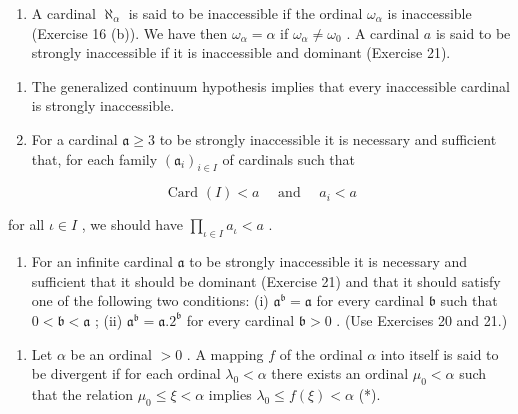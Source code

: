 \begin{enumerate}
\def\labelenumi{\arabic{enumi}.}
\setcounter{enumi}{21}
\tightlist
\item
  A cardinal \(\aleph_{\alpha}\) is said to be inaccessible if the ordinal \(\omega_{\alpha}\) is inaccessible (Exercise 16 (b)). We have then \(\omega_{\alpha} = \alpha\) if \(\omega_{\alpha} \neq \omega_{0}\) . A cardinal \(a\) is said to be strongly inaccessible if it is inaccessible and dominant (Exercise 21).
\end{enumerate}

\begin{enumerate}
\def\labelenumi{(\alph{enumi})}
\item
  The generalized continuum hypothesis implies that every inaccessible cardinal is strongly inaccessible.
\item
  For a cardinal \(\mathfrak{a} \geqslant 3\) to be strongly inaccessible it is necessary and sufficient that, for each family \((\mathfrak{a}_i)_{i \in I}\) of cardinals such that
\end{enumerate}

\[
\text { Card } (I) <   a \quad \text { and } \quad a _ {i} <   a
\]

for all \(\iota \in I\) , we should have \(\prod_{\iota \in I} a_{\iota} < a\) .

\begin{enumerate}
\def\labelenumi{(\alph{enumi})}
\setcounter{enumi}{2}
\tightlist
\item
  For an infinite cardinal \(\mathfrak{a}\) to be strongly inaccessible it is necessary and sufficient that it should be dominant (Exercise 21) and that it should satisfy one of the following two conditions: (i) \(\mathfrak{a}^{\mathfrak{b}} = \mathfrak{a}\) for every cardinal \(\mathfrak{b}\) such that \(0 < \mathfrak{b} < \mathfrak{a}\) ; (ii) \(\mathfrak{a}^{\mathfrak{b}} = \mathfrak{a}.2^{\mathfrak{b}}\) for every cardinal \(\mathfrak{b} > 0\) . (Use Exercises 20 and 21.)
\end{enumerate}

\begin{enumerate}
\def\labelenumi{\arabic{enumi}.}
\setcounter{enumi}{22}
\tightlist
\item
  Let \(\alpha\) be an ordinal \(>0\) . A mapping \(f\) of the ordinal \(\alpha\) into itself is said to be divergent if for each ordinal \(\lambda_0 < \alpha\) there exists an ordinal \(\mu_0 < \alpha\) such that the relation \(\mu_0 \leqslant \xi < \alpha\) implies \(\lambda_0 \leqslant f(\xi) < \alpha\) (*).
\end{enumerate}

